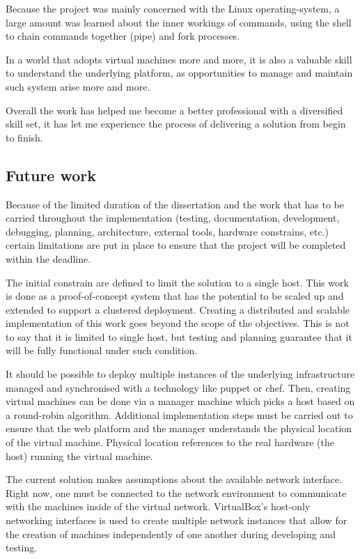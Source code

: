 \documentclass{article}
\begin{document}
Because the project was mainly concerned with the Linux \gls{operating-system}, a large amount was learned about the inner workings of commands, using the shell to chain commands together (pipe) and fork processes. 

In a world that adopts virtual machines more and more, it is also a valuable skill to understand the underlying platform, as opportunities to manage and maintain such system arise more and more.

Overall the work has helped me become a better professional with a diversified skill set, it has let me experience the process of delivering a solution from begin to finish.

\subsection{Future work}
Because of the limited duration of the dissertation and the work that has to be carried throughout the implementation (testing, documentation, development, debugging, planning, architecture, external tools, hardware constrains, etc.) certain limitations are put in place to ensure that the project will be completed within the deadline.

The initial constrain are defined to limit the solution to a single host. This work is done as a proof-of-concept system that has the potential to be scaled up and extended to support a clustered deployment.
Creating a distributed and scalable implementation of this work goes beyond the scope of the objectives. This is not to say that it is limited to single host, but testing and planning guarantee that it will be fully functional under such condition.

It should be possible to deploy multiple instances of the underlying infrastructure managed and synchronised with a technology like puppet or chef. Then, creating virtual machines can be done via a manager machine which picks a host based on a round-robin algorithm. Additional implementation steps must be carried out to ensure that the web platform and the manager understands the physical location of the virtual machine. Physical location references to the real hardware (the host) running the virtual machine.

The current solution makes assumptions about the available network interface. Right now, one must be connected to the network environment to communicate with the machines inside of the virtual network. VirtualBox's host-only networking interfaces is used to create multiple network instances that allow for the creation of machines independently of one another during developing and testing.
\end{document}
